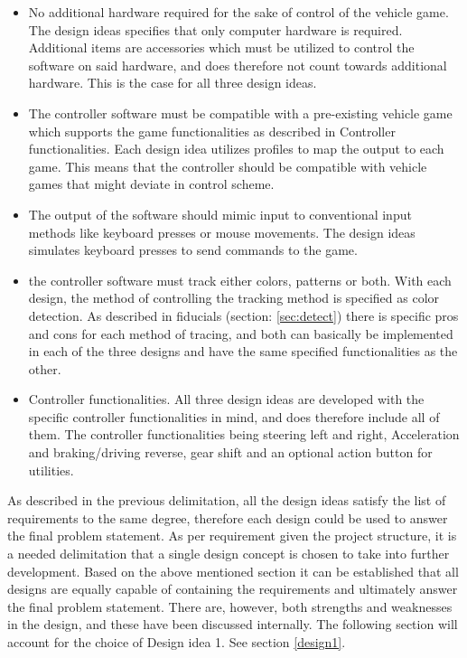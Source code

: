 \begin{itemize}
\item No additional hardware required for the sake of control of the vehicle game.\newline
The design ideas specifies that only computer hardware is required. Additional items are accessories which must be utilized to control the software on said hardware, and does therefore not count towards additional hardware. This is the case for all three design ideas.

\item The controller software must be compatible with a pre-existing vehicle game which supports
the game functionalities as described in Controller functionalities.\newline
Each design idea utilizes profiles to map the output to each game. This means that the controller should be compatible with vehicle games that might deviate in control scheme.

\item The output of the software should mimic input to conventional input methods like keyboard
presses or mouse movements.\newline
The design ideas simulates keyboard presses to send commands to the game. 

\item the controller software must track either colors, patterns or both.\newline
With each design, the method of controlling the tracking method is specified as color detection. As described in fiducials (section: \ref{sec:detect}) there is specific pros and cons for each method of tracing, and both can basically be implemented in each of the three designs and have the same specified functionalities as the other.

\item Controller functionalities.\newline
All three design ideas are developed with the specific controller functionalities in mind, and does therefore include all of them. The controller functionalities being steering left and right, Acceleration and braking/driving reverse, gear shift and an optional action button for utilities.

\end{itemize}

As described in the previous delimitation, all the design ideas satisfy the list of requirements to the same degree, therefore each design could be used to answer the final problem statement.
As per requirement given the project structure, it is a needed delimitation that a single design concept is chosen to take into further development. Based on the above mentioned section it can be established that all designs are equally capable of containing the requirements and ultimately answer the final problem statement. There are, however, both strengths and weaknesses in the design, and these have been discussed internally. The following section will account for the choice of Design idea 1. See section \ref{design1}.	

